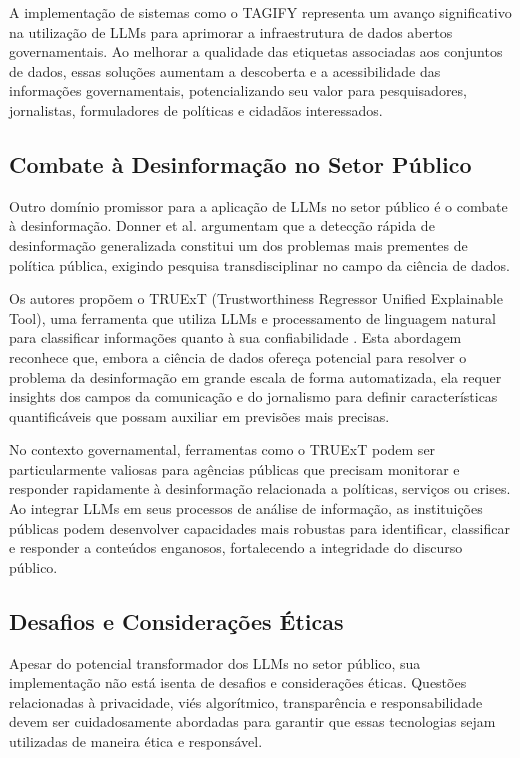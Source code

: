 A implementação de sistemas como o TAGIFY representa um avanço significativo na utilização de LLMs para aprimorar a infraestrutura de dados abertos governamentais. Ao melhorar a qualidade das etiquetas associadas aos conjuntos de dados, essas soluções aumentam a descoberta e a acessibilidade das informações governamentais, potencializando seu valor para pesquisadores, jornalistas, formuladores de políticas e cidadãos interessados.

\subsection{Combate à Desinformação no Setor Público}

Outro domínio promissor para a aplicação de LLMs no setor público é o combate à desinformação. Donner et al. \cite{Donner2024} argumentam que a detecção rápida de desinformação generalizada constitui um dos problemas mais prementes de política pública, exigindo pesquisa transdisciplinar no campo da ciência de dados.

Os autores propõem o TRUExT (Trustworthiness Regressor Unified Explainable Tool), uma ferramenta que utiliza LLMs e processamento de linguagem natural para classificar informações quanto à sua confiabilidade \cite{Donner2024}. Esta abordagem reconhece que, embora a ciência de dados ofereça potencial para resolver o problema da desinformação em grande escala de forma automatizada, ela requer insights dos campos da comunicação e do jornalismo para definir características quantificáveis que possam auxiliar em previsões mais precisas.

No contexto governamental, ferramentas como o TRUExT podem ser particularmente valiosas para agências públicas que precisam monitorar e responder rapidamente à desinformação relacionada a políticas, serviços ou crises. Ao integrar LLMs em seus processos de análise de informação, as instituições públicas podem desenvolver capacidades mais robustas para identificar, classificar e responder a conteúdos enganosos, fortalecendo a integridade do discurso público.

\subsection{Desafios e Considerações Éticas}

Apesar do potencial transformador dos LLMs no setor público, sua implementação não está isenta de desafios e considerações éticas. Questões relacionadas à privacidade, viés algorítmico, transparência e responsabilidade devem ser cuidadosamente abordadas para garantir que essas tecnologias sejam utilizadas de maneira ética e responsável.


